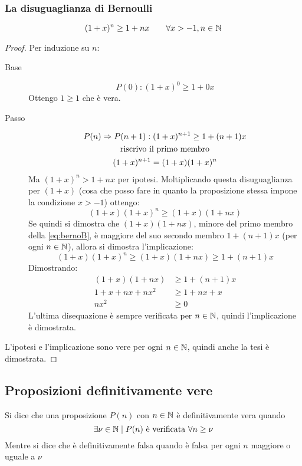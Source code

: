 \subsubsection{La disuguaglianza di Bernoulli}
\begin{teor}
	\label{dis_berno}
	\[
		(1+x)^n\geq1+nx \qquad\forall x>-1,n\in\mathbb{N}
	\]
\end{teor}
\begin{proof}
	Per induzione su $n$:
	\begin{description}
		\item[Base]
			\[
				P(0): (1+x)^0\geq1+0x
			\]
			Ottengo $1\geq1$ che è vera.
		\item[Passo]
			\begin{gather}
				\label{eq:bernoB}
				P(n)\Rightarrow P(n+1): (1+x)^{n+1}\geq1+(n+1)x\\
				\text{riscrivo il primo membro}\notag\\
				(1+x)^{n+1}=(1+x)(1+x)^n\notag
			\end{gather}
			Ma $(1+x)^n>1+nx$ per ipotesi. Moltiplicando questa disuguaglianza per $(1+x)$ (cosa che posso fare in quanto la proposizione stessa impone la condizione $x>-1$) ottengo:
			\[
				(1+x)(1+x)^n\geq(1+x)(1+nx)
			\]
			Se quindi si dimostra che $(1+x)(1+nx)$, minore del primo membro della \ref{eq:bernoB}, è maggiore del suo secondo membro $1+(n+1)x$ (per ogni $n\in\mathbb{N}$), allora si dimostra l'implicazione:
			\[
				(1+x)(1+x)^n\geq(1+x)(1+nx)\geq1+(n+1)x
			\]
			Dimostrando:
			\begin{align*}
				(1+x)(1+nx) & \geq1+(n+1)x \\
				1+x+nx+nx^2 & \geq1+nx+x   \\
				nx^2        & \geq0
			\end{align*}
			L'ultima disequazione è sempre verificata per $n\in\mathbb{N}$, quindi l'implicazione è dimostrata.
	\end{description}
	L'ipotesi e l'implicazione sono vere per ogni $n\in\mathbb{N}$, quindi anche la tesi è dimostrata.
\end{proof}




\subsection{Proposizioni definitivamente vere}
\begin{defin}
	Si dice che una proposizione $P(n)$ con $n\in\mathbb{N}$ è definitivamente vera quando
	\[
		\exists\nu\in\mathbb{N}\mid P(n) \text{ è verificata }\forall n\geq\nu
	\]
	Mentre si dice che è definitivamente falsa quando è falsa per ogni $n$ maggiore o uguale a $\nu$
\end{defin}

